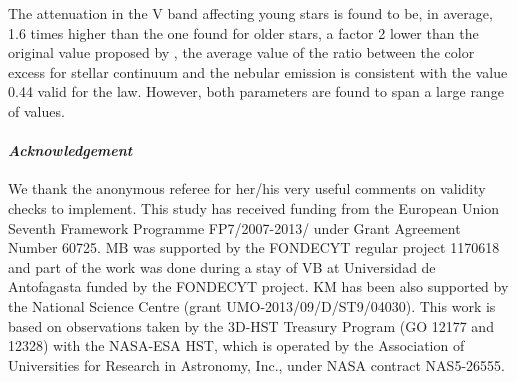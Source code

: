 \documentclass{aa}
\begin{document}
The attenuation in the V band affecting young stars is found to be, in average, 1.6 times higher than the one found for older stars, a factor 2 lower than the original value proposed by \citet{Charlot00}, the average value of the ratio between the color excess for stellar continuum and the nebular emission is consistent with the value 0.44 valid for the   \citet{Calzetti00} law. However, both parameters are found to span a large range of values.
 
\vspace{3cm}
\paragraph{\textit{Acknowledgement}}
We thank the anonymous referee for her/his very useful  comments on   validity checks to implement. This study has received funding from the European Union Seventh   Framework Programme  FP7/2007-2013/   under Grant Agreement Number 60725. MB was
supported by the FONDECYT regular project 1170618 and part of the work was done during a stay
of VB at Universidad de Antofagasta funded by the FONDECYT project. KM has been also supported by the National Science Centre (grant UMO-2013/09/D/ST9/04030).
This work is based on observations taken by the 3D-HST Treasury Program (GO 12177 and 12328) with the NASA-ESA HST, which is operated by the Association of Universities for Research in Astronomy, Inc., under NASA contract NAS5-26555.

\nocite{*}


\end{document}
